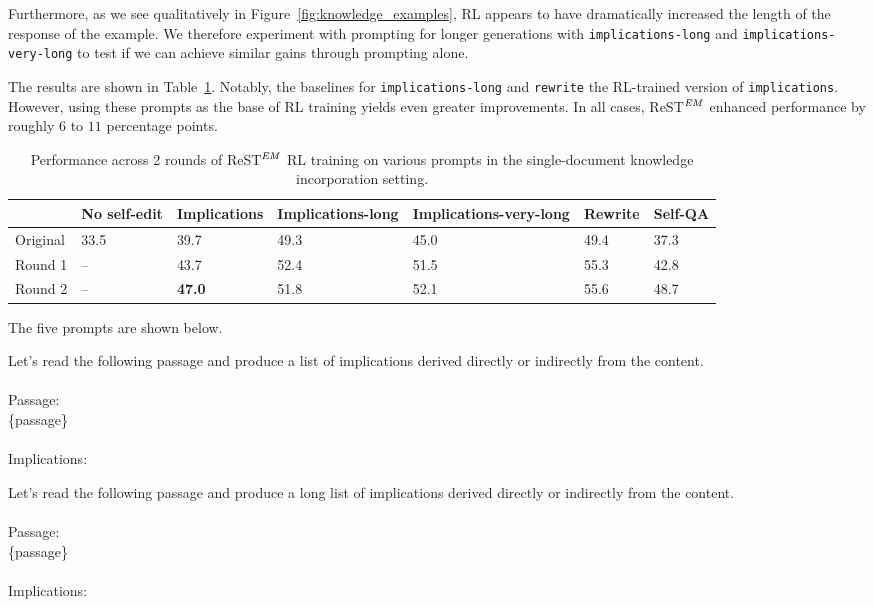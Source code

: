 \documentclass{article}
\begin{document}
Furthermore, as we see qualitatively in Figure~\ref{fig:knowledge_examples}, RL appears to have dramatically increased the length of the response of the example. We therefore experiment with prompting for longer generations with \texttt{implications-long} and \texttt{implications-very-long} to test if we can achieve similar gains through prompting alone.

The results are shown in Table~\ref{tab:prompting}. Notably, the baselines for \texttt{implications-long} and \texttt{rewrite} the RL-trained version of \texttt{implications}. However, using these prompts as the base of RL training yields even greater improvements. In all cases, ReST$^\text{\textit{EM}}$ enhanced performance by roughly $6$ to $11$ percentage points.

\begin{table}[h!]
\centering
\footnotesize
\begin{tabular}{l|p{1.6cm}|p{1.8cm}|p{1.8cm}|p{1.8cm}|p{1cm}|p{1.5cm}}
\textbf{} & \textbf{No self-edit} & \textbf{Implications} & \textbf{Implications-long} & \textbf{Implications-very-long} & \textbf{Rewrite} & \textbf{Self-QA} \\
\hline
Original & 33.5 & 39.7 & 49.3 & 45.0 & 49.4 & 37.3 \\
Round 1 & -- & 43.7 & 52.4 & 51.5 & 55.3 & 42.8 \\
Round 2 & -- & \textbf{47.0} & 51.8 & 52.1 & 55.6 & 48.7 \\
\end{tabular}
\vspace{6pt}
\caption{Performance across 2 rounds of ReST$^\text{\textit{EM}}$ RL training on various prompts in the single-document knowledge incorporation setting.}
\vspace{-6pt}
\label{tab:prompting}
\end{table}

The five prompts are shown below.

\begin{tcolorbox}[questionstyle, title=\texttt{implications}]
Let's read the following passage and produce a list of implications derived directly or indirectly from the content. \\ \\
Passage: \\ \{passage\} \\ \\
Implications:
\end{tcolorbox}

\begin{tcolorbox}[questionstyle, title=\texttt{implications-long}]
Let's read the following passage and produce a long list of implications derived directly or indirectly from the content. \\ \\
Passage: \\ \{passage\} \\ \\
Implications:
\end{tcolorbox}
\end{document}

